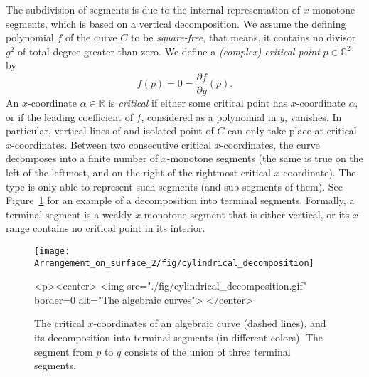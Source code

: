 \begin{ccAdvanced}
The subdivision of segments is due to the internal representation of 
$x$-monotone segments, which is based on a vertical decomposition.
We assume the defining polynomial $f$ of the curve $C$
to be \emph{square-free}, that means, it contains no divisor $g^2$ of total
degree greater than zero. We define a \emph{(complex) critical point}
$p\in\mathbb{C}^2$ by
%
$$f(p)=0=\frac{\partial f}{\partial y}(p).$$
%
An $x$-coordinate $\alpha\in\mathbb{R}$ is \emph{critical}
if either some critical point has $x$-coordinate $\alpha$,
or if the leading coefficient of $f$, considered as a polynomial in $y$,
vanishes. In particular, vertical lines of and isolated point of $C$
can only take place at critical $x$-coordinates.
Between two consecutive critical $x$-coordinates, the curve decomposes
into a finite number of $x$-monotone segments (the same is true on the left
of the leftmost, and on the right of the rightmost critical $x$-coordinate).
The type  is only able to represent such segments
(and sub-segments of them). See Figure~\ref{arr_fig:cylindrical_decomposition} 
for an example of a decomposition into terminal segments. Formally, 
a terminal segment is a weakly $x$-monotone segment that is either vertical, or
its $x$-range contains no critical point in its interior.

\end{ccAdvanced}

\begin{figure}[t]
\begin{ccTexOnly}
 \begin{center}
 \texttt{[image: Arrangement\_on\_surface\_2/fig/cylindrical\_decomposition]}
 \end{center}
\end{ccTexOnly}
\begin{ccHtmlOnly}
 <p><center>
 <img src="./fig/cylindrical_decomposition.gif" border=0 alt="The algebraic curves">
 </center>
\end{ccHtmlOnly}
\caption{The critical $x$-coordinates of an algebraic curve (dashed lines),
         and its decomposition into terminal segments (in different colors).
         The segment from $p$ to $q$ consists of the union of 
         three terminal segments.
         \label{arr_fig:cylindrical_decomposition}}
\end{figure}

